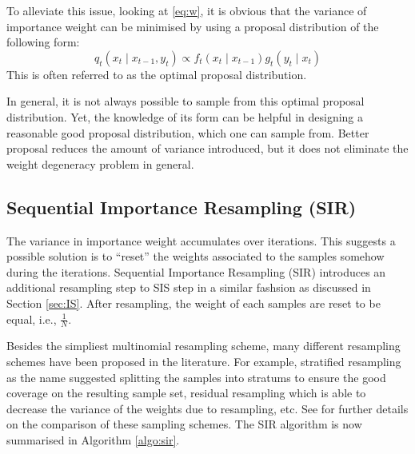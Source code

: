 To alleviate this issue, looking at \eqref{eq:w}, it is obvious that the variance of importance weight can be minimised by using a proposal distribution of the following form:
\begin{equation}
 q_{t}(x_{t} \mid x_{t-1}, y_t) \propto f_{t}(x_{t} \mid x_{t-1}) g_{t}(y_{t} \mid x_t)
\end{equation}
This is often referred to as the optimal proposal distribution.

In general, it is not always possible to sample from this optimal proposal distribution. Yet, the knowledge of its form can be helpful in designing a reasonable good proposal distribution, which one can sample from. Better
proposal reduces the amount of variance introduced, but it does not eliminate the weight degeneracy problem in general.

\subsection{Sequential Importance Resampling (SIR)}
The variance in importance weight accumulates over iterations. This suggests a possible solution is to ``reset'' the weights associated to the samples somehow during the iterations. Sequential Importance Resampling (SIR) introduces an additional resampling step to SIS step in a similar fashsion as discussed in Section \ref{sec:IS}. After resampling, the weight of each samples are reset to be equal, i.e., $\frac{1}{N}$.

Besides the simpliest multinomial resampling scheme, many different resampling schemes have been proposed in the literature. For example, stratified resampling \cite{KG96} as the name suggested splitting the samples into stratums to ensure the good coverage on the resulting sample set, residual resampling \cite{JSL98} which is able to decrease the variance of the weights due to resampling, etc. See \cite{DR05} for further details on the comparison of these sampling schemes.  The SIR algorithm is now summarised in Algorithm \ref{algo:sir}.

